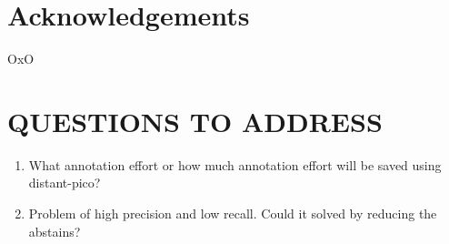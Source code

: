\documentclass[10.7pt,]{article}
\begin{document}
\section{Acknowledgements}\label{acknowledgements}
%
OxO
%
%
%
\section{QUESTIONS TO ADDRESS}\label{ques}
%
\begin{enumerate}
    \item What annotation effort or how much annotation effort will be saved using distant-pico?
    \item Problem of high precision and low recall. Could it solved by reducing the abstains?
\end{enumerate}
%
%
%


\end{document}
